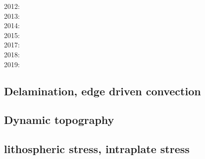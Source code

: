 2012: \cite{wagw12}\cite{vacl12}\cite{buit12}\cite{kogp12}\cite{gohg12}\cite{trub12}\\
2013: \cite{wazh13}\cite{krcu13}\cite{mutg13}\cite{frbm13}\cite{wagw13}\cite{duyp13}\\
2014: \cite{kava14}\cite{dusp14}\cite{rugb14}\cite{wavp14}\cite{whbb14}\cite{scml14}
      \cite{mals14}\cite{gupm14}\cite{gahs14}\\
2015: \cite{wavp15}\cite{thkp15}\cite{mags15}\cite{duys15}\\
2017: \cite{rugb17}\cite{ozgw17}\cite{vomc17}\cite{taac17}\\
2018: \cite{wavp18}\cite{nigw18}\cite{bemc18}\\
2019: \cite{koen19}\cite{kipd19}\cite{crcm19}\cite{pedm19}

\subsection*{Delamination, edge driven convection} 
 

\cite{kian95}
\cite{kian98}
\cite{kiri00}
\cite{modo04}
\cite{elki07}
\cite{gopy08}
\cite{vabv10}
\cite{vavg12}
\cite{krcu13}
\cite{baeg14}
\cite{bems17}

\subsection*{Dynamic topography} 

\cite{repa87}
\cite{kiha92}
\cite{bumo99}
\cite{cogu03}
\cite{cohu09}
\cite{bofb10}\cite{brau10b}\cite{stfh10}
\cite{rapy11}
\cite{brrs13}\cite{flgm13}
\cite{aupm15}\cite{kiff15}\cite{dali15}
\cite{yamm17}\cite{aumh17}
\cite{osss18}
\cite{deli19}

\subsection*{lithospheric stress, intraplate stress}

